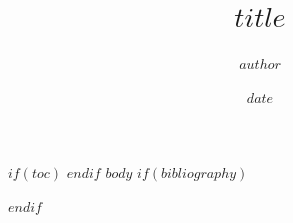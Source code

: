 \documentclass{chemlab}
\title{$title$}
\author{$author$}
\date{$date$}
\begin{document}
    \maketitle
    $if(toc)$
    \tableofcontents
    $endif$
    $body$
    $if(bibliography)$
    
    
    $endif$
\end{document}
